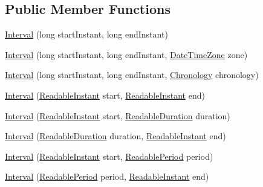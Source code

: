 \subsection*{Public Member Functions}
\begin{DoxyCompactItemize}
\item 
\hyperlink{classorg_1_1joda_1_1time_1_1_interval_a8f97ffa4ef2679d7fab9c542b6d8a1ad}{Interval} (long start\-Instant, long end\-Instant)
\item 
\hyperlink{classorg_1_1joda_1_1time_1_1_interval_a216b70a9c3a32129fa09a5e59b237701}{Interval} (long start\-Instant, long end\-Instant, \hyperlink{classorg_1_1joda_1_1time_1_1_date_time_zone}{Date\-Time\-Zone} zone)
\item 
\hyperlink{classorg_1_1joda_1_1time_1_1_interval_a5bb68aa15a41f65e2225f6147a29ec2d}{Interval} (long start\-Instant, long end\-Instant, \hyperlink{classorg_1_1joda_1_1time_1_1_chronology}{Chronology} chronology)
\item 
\hyperlink{classorg_1_1joda_1_1time_1_1_interval_aecd428652070e630a3a2778847e7dc6e}{Interval} (\hyperlink{interfaceorg_1_1joda_1_1time_1_1_readable_instant}{Readable\-Instant} start, \hyperlink{interfaceorg_1_1joda_1_1time_1_1_readable_instant}{Readable\-Instant} end)
\item 
\hyperlink{classorg_1_1joda_1_1time_1_1_interval_a02de647909cc9b3331ddd201f62b5e98}{Interval} (\hyperlink{interfaceorg_1_1joda_1_1time_1_1_readable_instant}{Readable\-Instant} start, \hyperlink{interfaceorg_1_1joda_1_1time_1_1_readable_duration}{Readable\-Duration} duration)
\item 
\hyperlink{classorg_1_1joda_1_1time_1_1_interval_a93cf87653d4916392d2950896307c88d}{Interval} (\hyperlink{interfaceorg_1_1joda_1_1time_1_1_readable_duration}{Readable\-Duration} duration, \hyperlink{interfaceorg_1_1joda_1_1time_1_1_readable_instant}{Readable\-Instant} end)
\item 
\hyperlink{classorg_1_1joda_1_1time_1_1_interval_ab7022f762ba7afc83900a4a57366bd7a}{Interval} (\hyperlink{interfaceorg_1_1joda_1_1time_1_1_readable_instant}{Readable\-Instant} start, \hyperlink{interfaceorg_1_1joda_1_1time_1_1_readable_period}{Readable\-Period} period)
\item 
\hyperlink{classorg_1_1joda_1_1time_1_1_interval_a5d49b9329fd87f9b144d63ac5cf647b6}{Interval} (\hyperlink{interfaceorg_1_1joda_1_1time_1_1_readable_period}{Readable\-Period} period, \hyperlink{interfaceorg_1_1joda_1_1time_1_1_readable_instant}{Readable\-Instant} end)
\item 

\end{DoxyCompactItemize}
